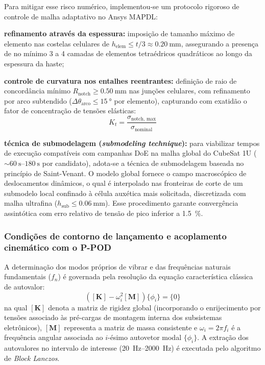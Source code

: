 Para mitigar esse risco numérico, implementou-se um protocolo rigoroso de controle de malha adaptativo no Ansys MAPDL:
\begin{alineas}
  \item \textbf{refinamento através da espessura:} imposição de tamanho máximo de elemento nas costelas celulares de $h_{\text{elem}} \le t / 3 \approx \SI{0.20}{\milli\metre}$, assegurando a presença de no mínimo 3 a 4 camadas de elementos tetraédricos quadráticos ao longo da espessura da haste;
  \item \textbf{controle de curvatura nos entalhes reentrantes:} definição de raio de concordância mínimo $R_{\text{notch}} \ge \SI{0.50}{\milli\metre}$ nas junções celulares, com refinamento por arco subtendido ($\Delta \theta_{\text{arco}} \le \SI{15}{\degree}$ por elemento), capturando com exatidão o fator de concentração de tensões elásticas:
  \begin{equation}
    K_t = \frac{\sigma_{\text{notch, max}}}{\sigma_{\text{nominal}}}
    \label{eq:kt}
  \end{equation}
  \item \textbf{técnica de submodelagem (\textit{submodeling technique}):} para viabilizar tempos de execução compatíveis com campanhas DoE na malha global do CubeSat 1U ($\sim \SIrange{60}{180}{\second}$ por candidato), adota-se a técnica de submodelagem baseada no princípio de Saint-Venant. O modelo global fornece o campo macroscópico de deslocamentos dinâmicos, o qual é interpolado nas fronteiras de corte de um submodelo local confinado à célula auxética mais solicitada, discretizada com malha ultrafina ($h_{\text{sub}} \le \SI{0.06}{\milli\metre}$). Esse procedimento garante convergência assintótica com erro relativo de tensão de pico inferior a \SI{1.5}{\percent}.
\end{alineas}

\subsubsection{Condições de contorno de lançamento e acoplamento cinemático com o P-POD}
\label{subsubsec:modal}

A determinação dos modos próprios de vibrar e das frequências naturais fundamentais ($f_n$) é governada pela resolução da equação característica clássica de autovalor:
\begin{equation}
  \left( [\mathbf{K}] - \omega_i^{2} [\mathbf{M}] \right) \{\phi_i\} = \{0\}
  \label{eq:autovalor}
\end{equation}
na qual $[\mathbf{K}]$ denota a matriz de rigidez global (incorporando o enrijecimento por tensões associado às pré-cargas de montagem interna dos subsistemas eletrônicos), $[\mathbf{M}]$ representa a matriz de massa consistente e $\omega_i = 2\pi f_i$ é a frequência angular associada ao $i$-ésimo autovetor modal $\{\phi_i\}$. A extração dos autovalores no intervalo de interesse (\SIrange{20}{2000}{\hertz}) é executada pelo algoritmo de \textit{Block Lanczos}.

